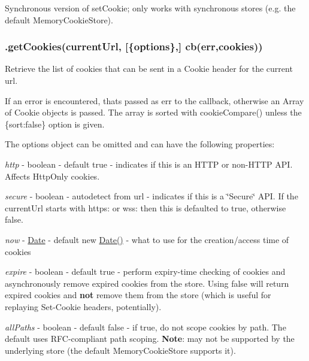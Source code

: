 Synchronous version of {\ttfamily set\+Cookie}; only works with synchronous stores (e.\+g. the default {\ttfamily Memory\+Cookie\+Store}).

\subsubsection*{{\ttfamily .get\+Cookies(current\+Url, \mbox{[}\{options\},\mbox{]} cb(err,cookies))}}

Retrieve the list of cookies that can be sent in a Cookie header for the current url.

If an error is encountered, that\textquotesingle{}s passed as {\ttfamily err} to the callback, otherwise an {\ttfamily Array} of {\ttfamily Cookie} objects is passed. The array is sorted with {\ttfamily cookie\+Compare()} unless the {\ttfamily \{sort\+:false\}} option is given.

The {\ttfamily options} object can be omitted and can have the following properties\+:


\begin{DoxyItemize}
\item {\itshape http} -\/ boolean -\/ default {\ttfamily true} -\/ indicates if this is an H\+T\+TP or non-\/\+H\+T\+TP A\+PI. Affects Http\+Only cookies.
\item {\itshape secure} -\/ boolean -\/ autodetect from url -\/ indicates if this is a \char`\"{}\+Secure\char`\"{} A\+PI. If the current\+Url starts with {\ttfamily https\+:} or {\ttfamily wss\+:} then this is defaulted to {\ttfamily true}, otherwise {\ttfamily false}.
\item {\itshape now} -\/ \mbox{\hyperlink{classDate}{Date}} -\/ default {\ttfamily new \mbox{\hyperlink{classDate}{Date()}}} -\/ what to use for the creation/access time of cookies
\item {\itshape expire} -\/ boolean -\/ default {\ttfamily true} -\/ perform expiry-\/time checking of cookies and asynchronously remove expired cookies from the store. Using {\ttfamily false} will return expired cookies and {\bfseries not} remove them from the store (which is useful for replaying Set-\/\+Cookie headers, potentially).
\item {\itshape all\+Paths} -\/ boolean -\/ default {\ttfamily false} -\/ if {\ttfamily true}, do not scope cookies by path. The default uses R\+F\+C-\/compliant path scoping. {\bfseries Note}\+: may not be supported by the underlying store (the default {\ttfamily Memory\+Cookie\+Store} supports it).
\end{DoxyItemize}

